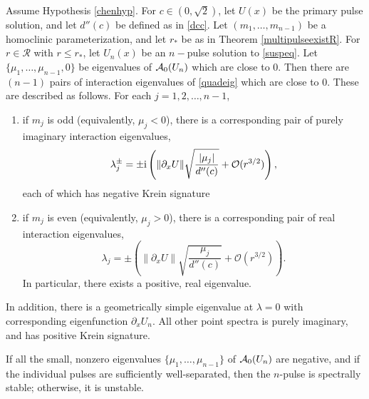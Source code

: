 \documentclass[thesis.tex]{subfiles}
\begin{document}
\begin{theorem}\label{chenstab}
Assume Hypothesis \cref{chenhyp}. For $c \in (0, \sqrt{2})$, let $U(x)$ be the primary pulse solution, and let $d''(c)$ be defined as in \cref{dcc}. Let $(m_1, \dots, m_{n-1})$ be a homoclinic parameterization, and let $r_*$ be as in Theorem \ref{multipulseexistR}. For $r \in \mathcal{R}$ with $r \leq r_*$, let $U_n(x)$ be an $n-$pulse solution to \cref{suspeq}. Let $\{\mu_1, \dots, \mu_{n-1}, 0\}$ be eigenvalues of $\mathcal{A}_0(U_n)$ which are close to 0. Then there are $(n-1)$ pairs of interaction eigenvalues of \cref{quadeig} which are close to 0. These are described as follows. For each $j=1,2,\dots,n-1$,
\begin{enumerate}
  \item if $m_j$ is odd (equivalently, $\mu_j<0$), there is a corresponding pair of purely imaginary interaction eigenvalues,
  \begin{equation}\label{npulseKreineigs}
	\lambda_j^\pm = \pm \mathrm{i} \left( \|\partial_xU\| \sqrt{ \frac{|\mu_j|}{d''(c)} } + \mathcal{O}(r^{3/2}) \right),
	\end{equation}
  each of which has negative Krein signature
  \item if $m_j$ is even (equivalently, $\mu_j>0$), there is a corresponding pair of real interaction eigenvalues,
   	\[
	\lambda_j = \pm \left( \|\partial_xU\| \sqrt{ \frac{\mu_j}{d''(c)} } + \mathcal{O}(r^{3/2}) \right).
	\]
  In particular, there exists a positive, real eigenvalue.
\end{enumerate}
In addition, there is a geometrically simple eigenvalue at $\lambda=0$ with corresponding eigenfunction $\partial_x U_n$. All other point spectra is purely imaginary, and has positive Krein signature.
\end{theorem}

\begin{remark}
If all the small, nonzero eigenvalues $\{ \mu_1, \dots, \mu_{n-1} \}$ of $\mathcal{A}_0(U_n)$ are negative, and if the individual pulses are sufficiently well-separated, then the $n$-pulse is spectrally stable; otherwise, it is unstable.
\end{remark}
\end{document}
